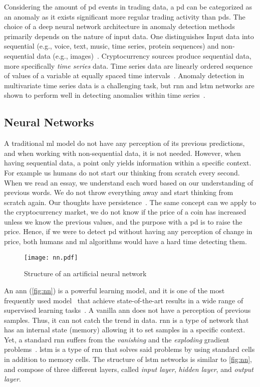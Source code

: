 Considering the amount of \ac{pd} events in trading data, a \ac{pd} can be categorized as an anomaly as it exists significant more regular trading activity than \acp{pd}. The choice of a deep neural network architecture in anomaly detection methods primarily depends on the nature of input data. One distinguishes Input data into sequential (e.g., voice, text, music, time series, protein sequences) and non-sequential data (e.g., images)~\cite{dl_anomaly}. Cryptocurrency sources produce sequential data, more specifically \emph{time series} data. Time series data are linearly ordered sequence of values of a variable at equally spaced time intervals~\cite{stat_handbook}. Anomaly detection in multivariate time series data is a challenging task, but \ac{rnn} and \ac{lstm} networks are shown to perform well in detecting anomalies within time series~\cite{dl_anomaly}.

\subsection{Neural Networks}
A traditional \ac{ml} model do not have any perception of its previous predictions, and when working with non-sequential data, it is not needed. However, when having sequential data, a point only yields information within a specific context. For example us humans do not start our thinking from scratch every second. When we read an essay, we understand each word based on our understanding of previous words. We do not throw everything away and start thinking from scratch again. Our thoughts have persistence~\cite{colah}. The same concept can we apply to the cryptocurrency market, we do not know if the price of a coin has increased unless we know the previous values, and the purpose with a \ac{pd} is to raise the price. Hence, if we were to detect \ac{pd} without having any perception of change in price, both humans and \ac{ml} algorithms would have a hard time detecting them.

\begin{figure}
    \centering
    \texttt{[image: nn.pdf]}
    \caption{Structure of an artificial neural network}
    \label{fig:nn}
\end{figure}

An \ac{ann} (\autoref{fig:nn}) is a powerful learning model, and it is one of the most frequently used model~\cite{hunt1992neural} that achieve state-of-the-art results in a wide range of supervised learning tasks~\cite{lipton2015critical}. A vanilla \ac{ann} does not have a perception of previous samples. Thus, it can not catch the trend in data. \ac{rnn} is a type of network that has an internal state (memory) allowing it to set samples in a specific context. Yet, a standard \ac{rnn} suffers from the \emph{vanishing} and the \emph{exploding} gradient problems~\cite{bengio1994learning}. \ac{lstm} is a type of \ac{rnn} that solves said problems by using standard cells in addition to memory cells. The structure of \ac{lstm} networks is similar to \autoref{fig:nn}, and compose of three different layers, called \emph{input layer}, \emph{hidden layer}, and \emph{output layer}.

